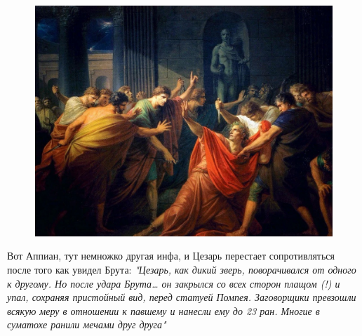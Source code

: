 \begin{figure}[h!tb] 
	\centering\includegraphics[scale=0.4]{ReligionRomeCaesar/1595745702141158794.png}
\end{figure}




Вот Аппиан, тут немножко другая инфа, и Цезарь перестает сопротивляться после того как увидел Брута:
\textit{"Цезарь, как дикий зверь, поворачивался от одного к другому. Но после удара Брута… он закрылся со всех сторон плащом (!) и упал, сохраняя пристойный вид, перед статуей Помпея. Заговорщики превзошли всякую меру в отношении к павшему и нанесли ему до 23 ран. Многие в суматохе ранили мечами друг друга"}

